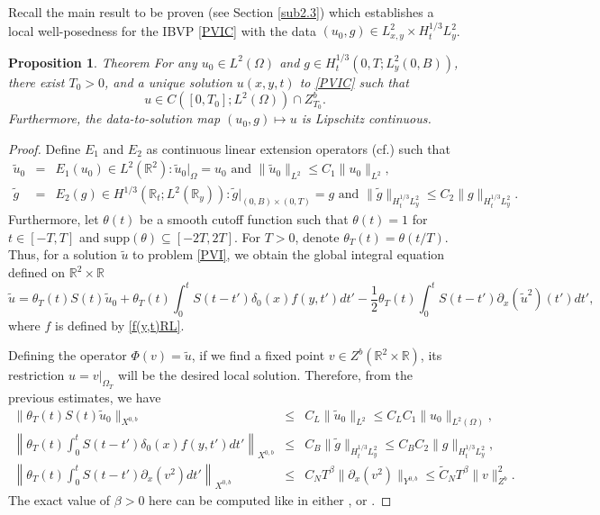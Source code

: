 \documentclass[11pt]{article}
\numberwithin{equation}{section}
\newtheorem{proposition}{Proposition}
\begin{document}
Recall the main result to be proven (see Section \ref{sub2.3}) which
establishes a local well-posedness for the IBVP \eqref{PVIC} with
the data $(u_{0}, g)\in L^{2}_{x,y}\times H^{1/3}_{t}L^{2}_{y}$.
\begin{proposition}{Theorem}
For any $u_{0}\in L^{2}(\Omega)$ and $g\in H^{1/3}_{t}(0,T;
L^{2}_{y}(0,B))$, there exist $T_{0}>0$, and a unique solution
$u(x,y,t)$ to \eqref{PVIC} such that
\begin{equation*}
u\in C([0,T_{0}];L^{2}(\Omega))\cap Z^{b}_{T_{0}}.
\end{equation*}
Furthermore, the data-to-solution map $(u_{0},g) \mapsto u$ is
Lipschitz continuous.
\end{proposition}
\begin{proof}
Define $E_{1}$ and $E_{2}$ as continuous linear extension operators (cf.\cite{CK}) such that
\begin{eqnarray}
\tilde{u}_{0} &=& E_{1}(u_{0}) \in L^{2}(\mathbb{R}^{2}) : \tilde{u}_{0}|_{\Omega} = u_{0} \text{ and } \|\tilde{u}_{0}\|_{L^{2}}
\le C_{1} \|u_{0}\|_{L^{2}},\\
\tilde{g} &=& E_{2}(g) \in H^{1/3}(\mathbb{R}_{t}; L^{2}(\mathbb{R}_{y})) : \tilde{g}|_{(0,B)\times(0,T)} = g \text{ and }
\|\tilde{g}\|_{H_{t}^{1/3}L_{y}^{2}} \le C_{2} \|g\|_{H_{t}^{1/3}L_{y}^{2}}.
\end{eqnarray}
Furthermore, let $\theta(t)$ be a smooth cutoff function such that $\theta(t) = 1$ for $t \in [-T, T]$ and $\text{supp}(\theta)
\subseteq [-2T, 2T]$. For $T > 0$, denote $\theta_{T}(t) = \theta(t/T)$.
Thus, for a solution $\tilde{u}$ to problem \eqref{PVI}, we obtain the global integral equation defined on $\mathbb{R}^2 \times \mathbb{R}$
\begin{equation}
\tilde{u} = \theta_{T}(t) S(t) \tilde{u}_{0} + \theta_{T}(t) \int_{0}^{t} S(t-t') \delta_{0}(x) f(y,t') dt' - \frac{1}{2} \theta_{T}(t) \int_{0}^{t} S(t-t') \partial_{x} (\tilde{u}^{2})(t') dt',
\end{equation}
where $f$ is defined by \eqref{f(y,t)RL}.

Defining the operator $\Phi(v)=\tilde{u}$, if we find a fixed point $v \in Z^{b}(\mathbb{R}^{2} \times \mathbb{R})$,
its restriction $u = v|_{\Omega_{T}}$ will be the desired local solution. Therefore, from the previous estimates, we have
\begin{eqnarray}
\|\theta_{T}(t) S(t) \tilde{u}_{0}\|_{X^{0,b}} &\le& C_{L} \|\tilde{u}_{0}\|_{L^2} \le C_{L} C_{1} \|u_{0}\|_{L^{2}(\Omega)}, \label{FP1}\\
\left\| \theta_{T}(t) \int_{0}^{t} S(t-t') \delta_{0}(x) f(y,t') dt' \right\|_{X^{0,b}} &\le& C_{B} \|\tilde{g}\|_{H_{t}^{1/3}L_{y}^{2}} \le C_{B} C_{2} \|g\|_{H_{t}^{1/3}L_{y}^{2}}, \label{FP2}\\
\left\| \theta_{T}(t) \int_{0}^{t} S(t-t') \partial_{x} (v^{2}) dt' \right\|_{X^{0,b}} &\le& C_{N} T^{\beta} \|\partial_{x} (v^{2})\|_{Y^{0,b}} \le \tilde{C}_{N} T^{\beta} \|v\|_{Z^{b}}^{2}. \label{FP3}
\end{eqnarray}
The exact value of $\beta > 0$ here can be computed like in either
\cite{LP}, or \cite{F}.


\end{proof}
\end{document}
